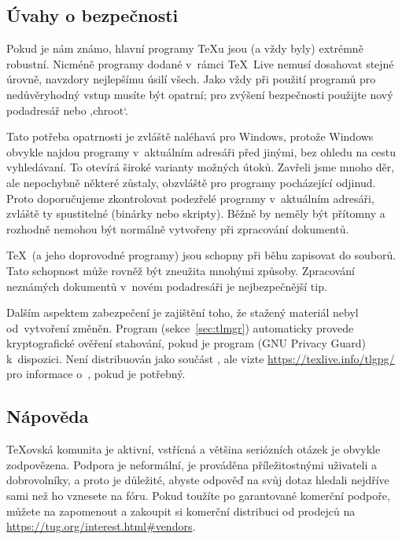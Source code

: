 \documentclass[\classoptions,slovak,english,czech]{\classname}
\newcommand{\singleuv}[1]{,#1`}
\begin{document}
\subsection{Úvahy o bezpečnosti}
\label{sec:security}

Pokud je nám známo, hlavní programy \TeX{u} jsou (a vždy byly)
extrémně robustní. Nicméně programy dodané v~rámci \TeX\ Live nemusí dosahovat
stejné úrovně, navzdory nejlepšímu úsilí všech. Jako vždy při použití programů
pro nedůvěryhodný vstup musíte být opatrní; pro zvýšení bezpečnosti použijte
nový podadresář nebo \singleuv{chroot}.

Tato potřeba opatrnosti je zvláště naléhavá pro Windows, protože 
Windows obvykle najdou programy v~aktuálním adresáři před jinými,
bez ohledu na cestu vyhledávaní. To otevírá široké varianty možných
útoků. Zavřeli jsme mnoho děr, ale nepochybně některé zůstaly,
obzvláště pro programy pocházející odjinud. Proto doporučujeme 
zkontrolovat podezřelé programy v~aktuálním adresáři, zvláště ty spustitelné 
(binárky nebo skripty). Běžně by neměly být přítomny a rozhodně
nemohou být normálně vytvořeny při zpracování dokumentů.

\TeX\ (a jeho doprovodné programy) jsou schopny při běhu
zapisovat do souborů. Tato schopnost může rovněž být zneužita 
mnohými způsoby. Zpracování neznámých dokumentů v~novém podadresáři 
je nejbezpečnější tip.

Dalším aspektem zabezpečení je zajištění toho, že stažený materiál nebyl
od~vytvoření změněn. Program 
(sekce~\ref{sec:tlmgr}) automaticky provede kryptografické
ověření stahování, pokud je program  (GNU Privacy Guard)
k~dispozici. Není distribuován jako součást \TL, ale vizte
\url{https://texlive.info/tlgpg/} pro informace o~, pokud
je potřebný.

\subsection{Nápověda}
\label{sec:help}

\TeX{}ovská komunita je aktivní, vstřícná a většina
seriózních otázek je obvykle zodpovězena. Podpora je
neformální, je prováděna příležitostnými uživateli a dobrovolníky,
a proto je důležité, abyste odpověď na svůj dotaz hledali nejdříve sami
než ho vznesete na fóru. Pokud toužíte po garantované komerční podpoře,
můžete na \TL{} zapomenout a zakoupit si komerční distribuci od
prodejců na \url{https://tug.org/interest.html#vendors}.
\end{document}
